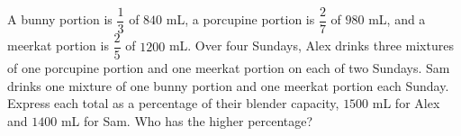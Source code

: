 A bunny portion is $\dfrac{1}{3}$ of $840$ mL, a porcupine portion is $\dfrac{2}{7}$ of $980$ mL, and a meerkat portion is $\dfrac{2}{5}$ of $1200$ mL. Over four Sundays, Alex drinks three mixtures of one porcupine portion and one meerkat portion on each of two Sundays. Sam drinks one mixture of one bunny portion and one meerkat portion each Sunday. Express each total as a percentage of their blender capacity, $1500$ mL for Alex and $1400$ mL for Sam. Who has the higher percentage?
